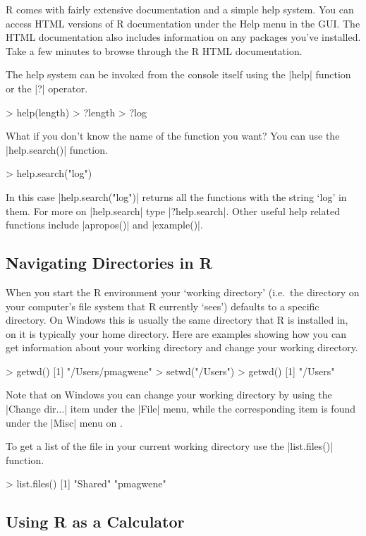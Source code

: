 R comes with fairly extensive documentation and a simple help system. You can
access HTML versions of R documentation under the Help menu in the GUI. The
HTML documentation also includes information on any packages you've installed.
Take a few minutes to browse through the R HTML documentation.

The help system can be invoked from the console itself using the
|help| function or the |?| operator.
%
\begin{R}
> help(length)
> ?length
> ?log
\end{R}
%
What if you don't know the name of the function you want? You can use
the |help.search()| function.
%
\begin{R}
> help.search("log")
\end{R}
%
In this case |help.search("log")| returns all the functions with
the string `log' in them. For more on |help.search| type
|?help.search|. Other useful help related functions include
|apropos()| and |example()|.

\subsection{Navigating Directories in R}

When you start the R environment your `working directory' (i.e.~the
directory on your computer's file system that R currently `sees')
defaults to a specific directory. On Windows this is usually the same
directory that R is installed in, on \OSX it is typically your home
directory. Here are examples showing how you can get information about
your working directory and change your working directory.
%
\begin{R}
> getwd()
[1] "/Users/pmagwene"
> setwd("/Users")
> getwd()
[1] "/Users"
\end{R}
%
Note that on Windows you can change your working directory by using the
|Change dir...| item under the |File| menu, while the corresponding item is found under the |Misc| menu on \OSX.

To get a list of the file in your current working directory use the
|list.files()| function.
%
\begin{R}
> list.files()
[1] "Shared" "pmagwene"
\end{R}



\subsection{Using R as a Calculator}

